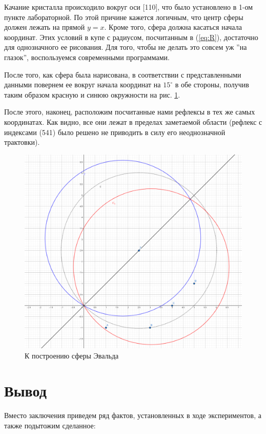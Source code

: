 \documentclass[a4paper, 12pt]{article}
\begin{document}
Качание кристалла происходило вокруг оси [110], что было установлено в 1-ом пункте лабораторной. По этой причине кажется логичным, что центр сферы должен лежать на прямой $y=x$. Кроме того, сфера должна касаться начала координат. Этих условий в купе с радиусом, посчитанным в (\ref{eq:R}), достаточно для однозначного ее рисования. Для того, чтобы не делать это совсем уж ''на глазок'', воспользуемся современными программами.

После того, как сфера была нарисована, в соответствии с представленными данными повернем ее вокруг начала координат на $15^\circ$ в обе стороны, получив таким образом красную и синюю окружности на  рис. \ref{fig:Evald}.

После этого, наконец, расположим посчитанные нами рефлексы в тех же самых координатах. Как видно, все они лежат в пределах заметаемой области (рефлекс с индексами (541) было решено не приводить в силу его неоднозначной трактовки).

\begin{figure}[H]
	\centering
	\includegraphics[width=0.9\linewidth]{Evald}
	\caption{К построению сферы Эвальда}
	\label{fig:Evald}
\end{figure}

\section{Вывод}

Вместо заключения приведем ряд фактов, установленных в ходе экспериментов, а также подытожим сделанное:
\end{document}
